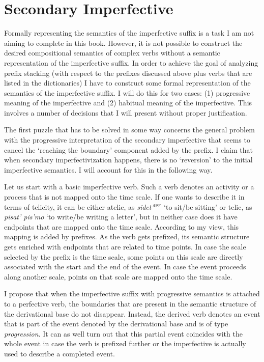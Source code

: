 \section{Secondary Imperfective}\label{section:imperfective}
Formally representing the semantics of the imperfective suffix is a task I am not aiming to complete in this book. However, it is not possible to construct the desired compositional semantics of complex verbs without a semantic representation of the imperfective suffix. In order to achieve the goal of analyzing prefix stacking (with respect to the prefixes discussed above plus verbs that are listed in the dictionaries) I have to construct some formal representation of the semantics of the imperfective suffix. I will do this for two cases: (1) progressive meaning of the imperfective and (2) habitual meaning of the imperfective. This involves a number of decisions that I will present without proper justification.

The first puzzle that has to be solved in some way concerns the general problem with the progressive interpretation of the secondary imperfective that seems to cancel the `reaching the boundary' component added by the prefix. I claim that when secondary imperfectivization happens, there is no `reversion' to the initial imperfective semantics. I will account for this in the following way. 

Let us start with a basic imperfective verb. Such a verb denotes an activity or a process that is not mapped onto the time scale. If one wants to describe it in terms of telicity, it can be either atelic, as \textit{sidet'}$^{\textsc{ipf}}$ `to sit/be sitting' or telic, as \textit{pisat' pis'mo} `to write/be writing a letter', but in neither case does it have endpoints that are mapped onto the time scale. According to my view, this mapping is added by prefixes. As the verb gets prefixed, its semantic structure gets enriched with endpoints that are related to time points. In case the scale selected by the prefix is the time scale, some points on this scale are directly associated with the start and the end of the event. In case the event proceeds along another scale, points on that scale are mapped onto the time scale. 

I propose that when the imperfective suffix with progressive semantics is attached to a perfective verb, the boundaries that are present in the semantic structure of the derivational base do not disappear. Instead, the derived verb denotes an event that is part of the event denoted by the derivational base and is of type \textit{progression}. It can as well turn out that this partial event coincides with the whole event in case the verb is prefixed further or the imperfective is actually used to describe a completed event.

